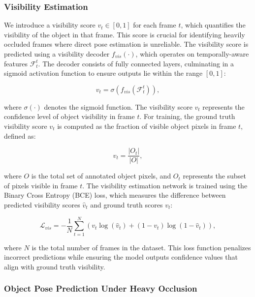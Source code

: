 \subsubsection{Visibility Estimation}

We introduce a visibility score $v_t \in [0, 1]$ for each frame $t$, which quantifies the visibility of the object in that frame. This score is crucial for identifying heavily occluded frames where direct pose estimation is unreliable. The visibility score is predicted using a visibility decoder $f_{vis}(\cdot)$, which operates on temporally-aware features $\mathcal{F}^t_t$. The decoder consists of fully connected layers, culminating in a sigmoid activation function to ensure outputs lie within the range $[0, 1]$:

\begin{equation}
v_t = \sigma(f_{vis}(\mathcal{F}^t_t)),
\end{equation}

\noindent where $\sigma(\cdot)$ denotes the sigmoid function. The visibility score $v_t$ represents the confidence level of object visibility in frame $t$. For training, the ground truth visibility score $v_t$ is computed as the fraction of visible object pixels in frame $t$, defined as:

\begin{equation}
v_t = \frac{|O_t|}{|O|},
\end{equation}

\noindent where $O$ is the total set of annotated object pixels, and $O_t$ represents the subset of pixels visible in frame $t$. The visibility estimation network is trained using the Binary Cross Entropy (BCE) loss, which measures the difference between predicted visibility scores $\hat{v}_t$ and ground truth scores $v_t$:

\begin{equation}
\mathcal{L}_{vis} = - \frac{1}{N} \sum_{t=1}^{N} \left( v_t \log(\hat{v}_t) + (1 - v_t) \log(1 - \hat{v}_t) \right),
\end{equation}

\noindent where $N$ is the total number of frames in the dataset. This loss function penalizes incorrect predictions while ensuring the model outputs confidence values that align with ground truth visibility.

\subsubsection{Object Pose Prediction Under Heavy Occlusion}

